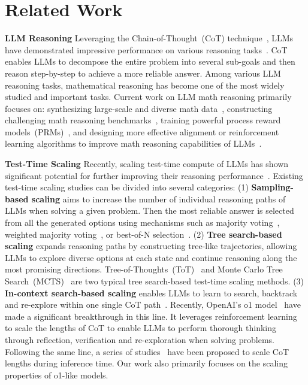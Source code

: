 \section{Related Work}
\textbf{LLM Reasoning}
Leveraging the Chain-of-Thought~(CoT) technique~\citep{cot,auto-cot}, LLMs have demonstrated impressive performance on various reasoning tasks~\citep{codellama,gpqa,deepseekmath}. CoT enables LLMs to decompose the entire problem into several sub-goals and then reason step-by-step to achieve a more reliable answer. Among various LLM reasoning tasks, mathematical reasoning has become one of the most widely studied and important tasks. Current work on LLM math reasoning primarily focuses on: synthesizing large-scale and diverse math data~\citep{star,metamath, numinamath}, constructing challenging math reasoning benchmarks~\citep{omni-math,frontiermath}, training powerful process reward models~(PRMs)~\citep{prm800k,math-shepherd,skywork-o1}, and designing more effective alignment or reinforcement learning algorithms to improve math reasoning capabilities of LLMs~\citep{step-dpo,rstar-math,prime}.~

\textbf{Test-Time Scaling}
Recently, scaling test-time compute of LLMs has shown significant potential for further improving their reasoning performance~\citep{large-language-monkeys,more-llm-calls}. Existing test-time scaling studies can be divided into several categories: (1) \textbf{Sampling-based scaling} aims to increase the number of individual reasoning paths of LLMs when solving a given problem. Then the most reliable answer is selected from all the generated options using mechanisms such as majority voting~\citep{self-consistency}, weighted majority voting~\citep{weighted-majority-voting}, or best-of-N selection~\citep{prm800k}. (2) \textbf{Tree search-based scaling} expands reasoning paths by constructing tree-like trajectories, allowing LLMs to explore diverse options at each state and continue reasoning along the most promising directions. Tree-of-Thoughts~(ToT)~\citep{tot} and Monte Carlo Tree Search~(MCTS)~\citep{empirical-compute-optimal-inference,mcts-refine,scaling-optimally,marco-o1} are two typical tree search-based test-time scaling methods. (3) \textbf{In-context search-based scaling} enables LLMs to learn to search, backtrack and re-explore within one single CoT path~\citep{stream-of-search}.  %
Recently, OpenAI's o1 model~\citep{o1} have made a significant breakthrough in this line. It leverages reinforcement learning to scale the lengths of CoT to enable LLMs to perform thorough thinking through reflection, verification and re-exploration when solving problems. Following the same line, a series of studies~\citep{skywork-o1,r1,qwq,gemini-flash-thinking,still,o1-journey2} have been proposed to scale CoT lengths during inference time. Our work also primarily focuses on the scaling properties of o1-like models.



